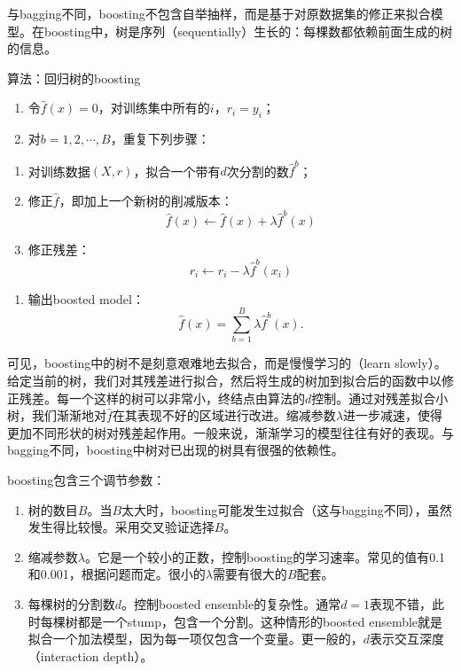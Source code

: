 \documentclass[hyperref,]{ctexart}
\providecommand{\tightlist}{%
  \setlength{\itemsep}{0pt}\setlength{\parskip}{0pt}}
\begin{document}
与bagging不同，boosting不包含自举抽样，而是基于对原数据集的修正来拟合模型。在boosting中，树是序列（sequentially）生长的：每棵数都依赖前面生成的树的信息。

算法：回归树的boosting

\begin{enumerate}
\def\labelenumi{\arabic{enumi}.}
\tightlist
\item
  令\(\hat{f}(x)=0\)，对训练集中所有的\(i\)，\(r_i=y_i\)；
\item
  对\(b=1,2,\cdots,B\)，重复下列步骤：
\end{enumerate}

\begin{enumerate}
\def\labelenumi{(\alph{enumi})}
\tightlist
\item
  对训练数据\((X,r)\)，拟合一个带有\(d\)次分割的数\(\hat{f}^b\)；
\item
  修正\(\hat{f}\)，即加上一个新树的削减版本：
  \[\hat{f}(x)\leftarrow \hat{f}(x) + \lambda\hat{f}^b(x)\]
\item
  修正残差： \[r_i\leftarrow r_i-\lambda \hat{f}^b(x_i)\]
\end{enumerate}

\begin{enumerate}
\def\labelenumi{\arabic{enumi}.}
\setcounter{enumi}{2}
\tightlist
\item
  输出boosted model： \[\hat{f}(x)=\sum_{b=1}^B \lambda\hat{f}^b(x).\]
\end{enumerate}

可见，boosting中的树不是刻意艰难地去拟合，而是慢慢学习的（learn
slowly）。给定当前的树，我们对其残差进行拟合，然后将生成的树加到拟合后的函数中以修正残差。每一个这样的树可以非常小，终结点由算法的\(d\)控制。通过对残差拟合小树，我们渐渐地对\(\hat{f}\)在其表现不好的区域进行改进。缩减参数\(\lambda\)进一步减速，使得更加不同形状的树对残差起作用。一般来说，渐渐学习的模型往往有好的表现。与bagging不同，boosting中树对已出现的树具有很强的依赖性。

boosting包含三个调节参数：

\begin{enumerate}
\def\labelenumi{\arabic{enumi}.}
\tightlist
\item
  树的数目\(B\)。当\(B\)太大时，boosting可能发生过拟合（这与bagging不同），虽然发生得比较慢。采用交叉验证选择\(B\)。
\item
  缩减参数\(\lambda\)。它是一个较小的正数，控制boosting的学习速率。常见的值有0.1和0.001，根据问题而定。很小的\(\lambda\)需要有很大的\(B\)配套。
\item
  每棵树的分割数\(d\)。控制boosted
  ensemble的复杂性。通常\(d=1\)表现不错，此时每棵树都是一个stump，包含一个分割。这种情形的boosted
  ensemble就是拟合一个加法模型，因为每一项仅包含一个变量。更一般的，\(d\)表示交互深度（interaction
  depth）。
\end{enumerate}
\end{document}
